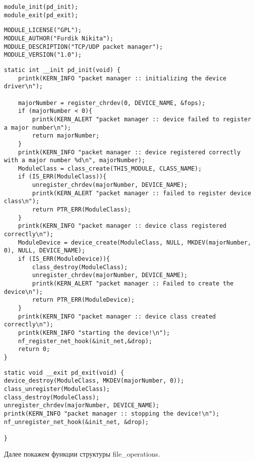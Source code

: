 \begin{lstlisting}[caption = Инициализация модуля ядра]
module_init(pd_init);
module_exit(pd_exit);
\end{lstlisting}

\begin{lstlisting}[caption = Макросы модуля]
MODULE_LICENSE("GPL");
MODULE_AUTHOR("Furdik Nikita");
MODULE_DESCRIPTION("TCP/UDP packet manager");
MODULE_VERSION("1.0");
\end{lstlisting}
\newpage
\begin{lstlisting}[caption = Констуктор модуля]
static int __init pd_init(void) {
	printk(KERN_INFO "packet manager :: initializing the device driver\n");
	
	majorNumber = register_chrdev(0, DEVICE_NAME, &fops);
	if (majorNumber < 0){
		printk(KERN_ALERT "packet manager :: device failed to register a major number\n");
		return majorNumber;
	}
	printk(KERN_INFO "packet manager :: device registered correctly with a major number %d\n", majorNumber);
	ModuleClass = class_create(THIS_MODULE, CLASS_NAME);
	if (IS_ERR(ModuleClass)){
		unregister_chrdev(majorNumber, DEVICE_NAME);
		printk(KERN_ALERT "packet manager :: failed to register device class\n");
		return PTR_ERR(ModuleClass);
	}
	printk(KERN_INFO "packet manager :: device class registered correctly\n");
	ModuleDevice = device_create(ModuleClass, NULL, MKDEV(majorNumber, 0), NULL, DEVICE_NAME);
	if (IS_ERR(ModuleDevice)){
		class_destroy(ModuleClass);
		unregister_chrdev(majorNumber, DEVICE_NAME);
		printk(KERN_ALERT "packet manager :: Failed to create the device\n");
		return PTR_ERR(ModuleDevice);
	}
	printk(KERN_INFO "packet manager :: device class created correctly\n");
	printk(KERN_INFO "starting the device!\n");
	nf_register_net_hook(&init_net,&drop);
	return 0;
}\end{lstlisting}
\begin{lstlisting}[caption = Деструктор модуля]
static void __exit pd_exit(void) {
device_destroy(ModuleClass, MKDEV(majorNumber, 0));
class_unregister(ModuleClass);
class_destroy(ModuleClass);
unregister_chrdev(majorNumber, DEVICE_NAME);
printk(KERN_INFO "packet manager :: stopping the device!\n");
nf_unregister_net_hook(&init_net, &drop);

}

\end{lstlisting}

Далее покажем функции структуры file\_operations.


